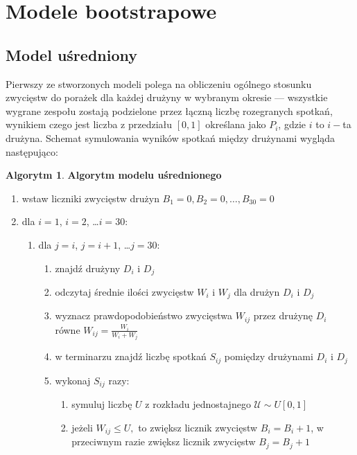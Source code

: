 \documentclass[inzynierska]{pwr_wmat_praca_dyplomowa}
\theoremstyle{plain}
\numberwithin{theorem}{chapter}
\theoremstyle{definition}
\numberwithin{theorem}{chapter}
\newtheorem{algorytm}[theorem]{Algorytm}
\begin{document}
\section{Modele bootstrapowe}

\subsection{Model uśredniony}
Pierwszy ze stworzonych modeli polega na obliczeniu ogólnego stosunku zwycięstw do porażek dla każdej drużyny w wybranym okresie --- wszystkie wygrane zespołu zostają podzielone przez łączną liczbę rozegranych spotkań, wynikiem czego jest liczba z przedziału $[0,1]$ określana jako $P_{i}$, gdzie $i$ to $i-$ta drużyna. Schemat symulowania wyników spotkań między drużynami wygląda następująco:

\begin{algorytm} \textbf{Algorytm modelu uśrednionego}
	\begin{enumerate}
	\item wstaw liczniki zwycięstw drużyn $B_1= 0,B_2= 0,\dots, B_{30}= 0$
	\item dla $i=1$, $i=2$, \dots $i=30$: 
	\begin{enumerate}
		\item dla $j=i$, $j=i+1$, \dots $j=30$: 
		\begin{enumerate}
			\item znajdź drużyny $D_i$ i $D_j$
		\item odczytaj średnie ilości zwycięstw $W_i$ i $W_j$ dla drużyn $D_i$ i $D_j$ 
		\item wyznacz prawdopodobieństwo zwycięstwa $W_{ij}$ przez drużynę  $D_i$ równe $W_{ij}=\frac{W_i}{W_i + W_j}$   
		\item w terminarzu znajdź liczbę spotkań $S_{ij}$ pomiędzy drużynami $D_i$ i $D_j$
		\item wykonaj $S_{ij}$ razy:
			\begin{enumerate}
				\item symuluj liczbę $U$ z rozkładu jednostajnego $\mathcal{U}\sim U[0,1]$ 
			\item jeżeli $W_{ij} \leq U,$ to zwiększ licznik zwycięstw $B_i=B_i+1$, w przeciwnym razie zwiększ licznik zwycięstw $B_j=B_j+1$
			\end{enumerate}
		\end{enumerate}
	\end{enumerate}
\end{enumerate}
\end{algorytm} 
 
\end{document}
